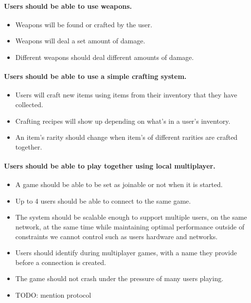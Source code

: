 \documentclass{article}
\begin{document}
\paragraph{Users should be able to use weapons.}
\begin{itemize}
	\item Weapons will be found or crafted by the user.
	\item Weapons will deal a set amount of damage.
	\item Different weapons should deal different amounts of damage.
\end{itemize}

\paragraph{Users should be able to use a simple crafting system.}
\begin{itemize}
	\item Users will craft new items using items from their inventory that they have collected.
	\item Crafting recipes will show up depending on what’s in a user's inventory.
	\item An item’s rarity should change when item’s of different rarities are crafted together.
\end{itemize}

\paragraph{Users should be able to play together using local multiplayer.}
\begin{itemize}
	\item A game should be able to be set as joinable or not when it is started.
	\item Up to 4 users should be able to connect to the same game.
	\item The system should be scalable enough to support multiple users, on the same network, at the same time while maintaining optimal performance outside of constraints we cannot control such as users hardware and networks.
	\item Users should identify during multiplayer games, with a name they provide before a connection is created.
	\item The game should not crash under the pressure of many users playing.
	\item TODO: mention protocol
\end{itemize}
\end{document}

